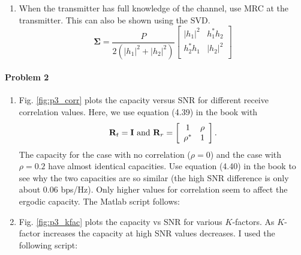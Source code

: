 \documentclass[12pt]{article}
\begin{document}
\begin{enumerate}
\item When the transmitter has full knowledge of the channel, use MRC at the transmitter. This can also be shown using the SVD.
\begin{equation*}
\pmb \Sigma=
\frac{P}{2(|h_1|^2+|h_2|^2)}
\left[ \begin{array}{cc}
|h_1|^2 & h_1^*h_2\\
h_2^*h_1 & |h_2|^2\\
\end{array}\right ]
\end{equation*}
\end{enumerate}


\paragraph{Problem 2} \begin{enumerate}
\item Fig. \ref{fig:p3_corr} plots the capacity versus SNR for
different receive correlation values.  Here, we use equation (4.39) in the book with
\[
{\bf R}_t={\bf I} \text{ and }{\bf R}_r=\left[\begin{array}{cc} 1
& \rho\\ \rho^* & 1\end{array}\right].
\]
The capacity for the case with no correlation ($\rho=0$) and the
case with $\rho=0.2$ have almost identical capacities.  Use
equation (4.40) in the book to see why the two capacities are so
similar (the high SNR difference is only about 0.06 bps/Hz). Only
higher values for correlation seem to affect the ergodic capacity.
The Matlab script follows:
\begin{footnotesize}

\end{footnotesize}

\item Fig. \ref{fig:p3_kfac} plots the capacity vs SNR for various
$K$-factors.  As $K$-factor increases the capacity at high SNR
values decreases.  I used the following script:
\begin{footnotesize}

\end{footnotesize}


\end{enumerate}
\end{document}
